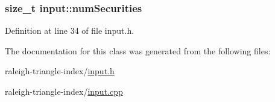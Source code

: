 \subsubsection[{\texorpdfstring{num\+Securities}{numSecurities}}]{\setlength{\rightskip}{0pt plus 5cm}size\+\_\+t input\+::num\+Securities}\hypertarget{classinput_ab068464f56aecfd936ab32eb25e43daa}{}\label{classinput_ab068464f56aecfd936ab32eb25e43daa}


Definition at line 34 of file input.\+h.



The documentation for this class was generated from the following files\+:\begin{DoxyCompactItemize}
\item 
raleigh-\/triangle-\/index/\hyperlink{input_8h}{input.\+h}\item 
raleigh-\/triangle-\/index/\hyperlink{input_8cpp}{input.\+cpp}\end{DoxyCompactItemize}

